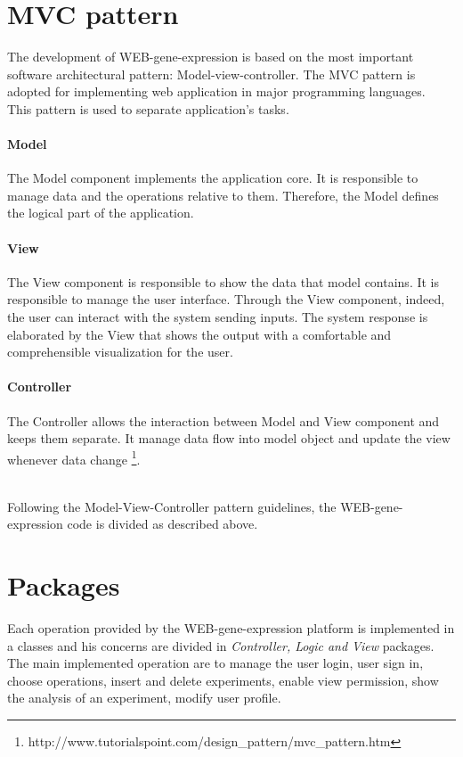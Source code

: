 \documentclass[a4paper]{report}
\begin{document}
\section{MVC pattern} \label{mvc}

The development of WEB-gene-expression is based on the most important software architectural pattern: Model-view-controller. The MVC pattern is adopted for implementing web application in major programming languages.\\
This pattern is used to separate application's tasks.


  \paragraph{Model} The Model component implements the application core. It is responsible to manage data and the operations relative to them. Therefore, the Model defines the logical part of the application.
  \paragraph{View} The View component is responsible to show the data that model contains. It is responsible to manage the user interface. Through the View component, indeed, the user can interact with the system sending inputs. The system response is elaborated by the View that shows the output with a comfortable and comprehensible visualization for the user.
  \paragraph{Controller} The Controller allows the interaction between Model and View component and keeps them separate. It manage data flow into model object and update the view whenever data change \footnote{http://www.tutorialspoint.com/design\_pattern/mvc\_pattern.htm}.  

\
\\Following the Model-View-Controller pattern guidelines, the WEB-gene-expression code is divided as described above.

\section{Packages}

Each operation provided by the WEB-gene-expression platform is implemented in a classes and his concerns are divided in \emph{Controller, Logic and View} packages. 
The main implemented operation are to manage the user login, user sign in, choose operations, insert and delete experiments, enable view permission, show the analysis of an experiment, modify user profile.
\end{document}
